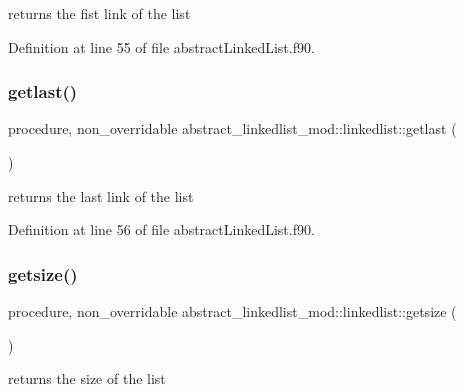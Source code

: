 returns the fist link of the list 



Definition at line 55 of file abstract\+Linked\+List.\+f90.

\mbox{\label{structabstract__linkedlist__mod_1_1linkedlist_a17366518d094a62e8e68fa4c5681810c}} 
\subsubsection{\texorpdfstring{getlast()}{getlast()}}
{\footnotesize\ttfamily procedure, non\+\_\+overridable abstract\+\_\+linkedlist\+\_\+mod\+::linkedlist\+::getlast (\begin{DoxyParamCaption}{ }\end{DoxyParamCaption})\hspace{0.3cm}{\ttfamily [private]}}



returns the last link of the list 



Definition at line 56 of file abstract\+Linked\+List.\+f90.

\mbox{\label{structabstract__linkedlist__mod_1_1linkedlist_a18806ecb0fb5dea1e754de35d3700ab7}} 
\subsubsection{\texorpdfstring{getsize()}{getsize()}}
{\footnotesize\ttfamily procedure, non\+\_\+overridable abstract\+\_\+linkedlist\+\_\+mod\+::linkedlist\+::getsize (\begin{DoxyParamCaption}{ }\end{DoxyParamCaption})\hspace{0.3cm}{\ttfamily [private]}}



returns the size of the list 



